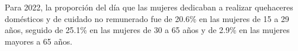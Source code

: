 Para 2022, la proporción del día que las mujeres dedicaban a realizar quehaceres domésticos y de cuidado no remunerado fue de 20.6\% en las mujeres de 15 a 29 años, seguido de 25.1\% en las mujeres de 30 a 65 años y de 2.9\% en las mujeres mayores a 65 años. 
